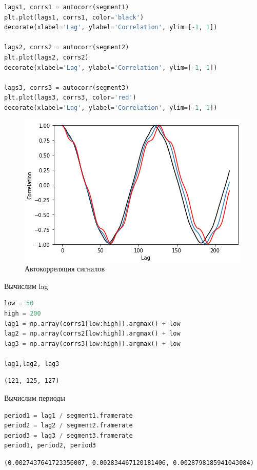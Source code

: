 \begin{lstlisting}[language=Python]
lags1, corrs1 = autocorr(segment1)
plt.plot(lags1, corrs1, color='black')
decorate(xlabel='Lag', ylabel='Correlation', ylim=[-1, 1])

lags2, corrs2 = autocorr(segment2)
plt.plot(lags2, corrs2)
decorate(xlabel='Lag', ylabel='Correlation', ylim=[-1, 1])

lags3, corrs3 = autocorr(segment3)
plt.plot(lags3, corrs3, color='red')
decorate(xlabel='Lag', ylabel='Correlation', ylim=[-1, 1])
\end{lstlisting}
\begin{figure}[H]
	\begin{center}
		\includegraphics[scale=1]{fig/lab05/lab5_2.png}
		\caption{Автокорреляция сигналов}
	\end{center}
\end{figure}

Вычислим lag

\begin{lstlisting}[language=Python]
low = 50
high = 200
lag1 = np.array(corrs1[low:high]).argmax() + low
lag2 = np.array(corrs2[low:high]).argmax() + low
lag3 = np.array(corrs3[low:high]).argmax() + low

lag1,lag2, lag3
\end{lstlisting}
\begin{lstlisting}
(121, 125, 127)
\end{lstlisting}

Вычислим периоды

\begin{lstlisting}[language=Python]
period1 = lag1 / segment1.framerate
period2 = lag2 / segment2.framerate
period3 = lag3 / segment3.framerate
period1, period2, period3
\end{lstlisting}
\begin{lstlisting}
(0.0027437641723356007, 0.002834467120181406, 0.0028798185941043084)
\end{lstlisting}

